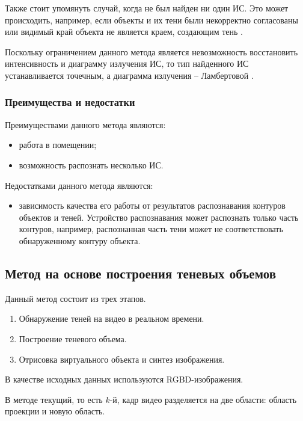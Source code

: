 Также стоит упомянуть случай, когда не был найден ни один ИС. Это может происходить, например, если объекты и их тени были некорректно согласованы или видимый край объекта не является краем, создающим тень \cite{shadow_contours_method}.

Поскольку ограничением данного метода является невозможность восстановить интенсивность и диаграмму излучения ИС, то тип найденного ИС устанавливается точечным, а диаграмма излучения -- Ламбертовой \cite{shadow_contours_method}.

\subsubsection*{Преимущества и недостатки}

Преимуществами данного метода являются:

\begin{itemize}
	\item работа в помещении;
	\item возможность распознать несколько ИС. 
\end{itemize}

Недостатками данного метода являются:

\begin{itemize}
	\item зависимость качества его работы от результатов распознавания контуров объектов и теней. Устройство распознавания может распознать только часть контуров, например, распознанная часть тени может не соответствовать обнаруженному контуру объекта.
\end{itemize}

\subsection{Метод на основе построения теневых объемов}

Данный метод состоит из трех этапов.

\begin{enumerate}
	\item Обнаружение теней на видео в реальном времени.
	\item Построение теневого объема.
	\item Отрисовка виртуального объекта и синтез изображения.
\end{enumerate}

В качестве исходных данных используются RGBD-изображения.

В методе текущий, то есть $k$-й, кадр видео разделяется на две области: область проекции и новую область. 

